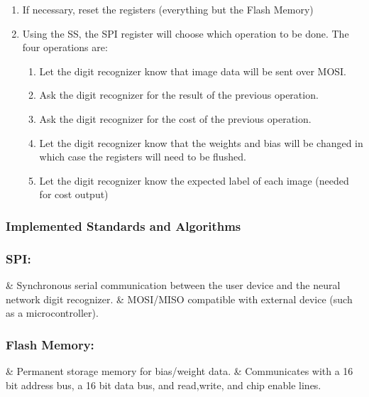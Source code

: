 \documentclass[12pt]{article}
\begin{document}
\begin{enumerate}
    \item If necessary, reset the registers (everything but the Flash Memory)
    \item Using the SS, the SPI register will choose which operation to be done. The four operations are:
        \begin{enumerate}
            \item Let the digit recognizer know that image data will be sent over MOSI.
            \item Ask the digit recognizer for the result of the previous operation.
            \item Ask the digit recognizer for the cost of the previous operation.
            \item Let the digit recognizer know that the weights and bias will be changed in which case the registers will need to be flushed.
            \item Let the digit recognizer know the expected label of each image (needed for cost output)
        \end{enumerate}
\end{enumerate}
\newpage

\subsubsection{Implemented Standards and Algorithms\label{sec:standards}}

\subsubsection*{SPI:}

\begin{easylist}[itemize]
& Synchronous serial communication between the user device and the neural network digit recognizer.
& MOSI/MISO compatible with external device (such as a microcontroller).
\end{easylist}



\subsubsection*{Flash Memory:}

\begin{easylist}
& Permanent storage memory for bias/weight data.
& Communicates with a 16 bit address bus, a 16 bit data bus, and read,write, and chip enable lines.
\end{easylist}
\end{document}
